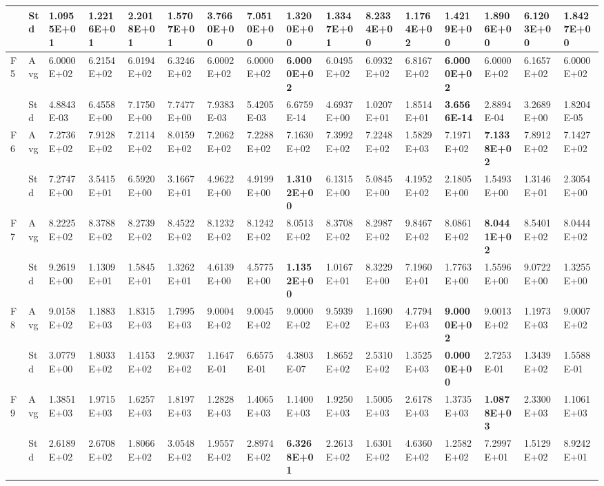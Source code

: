 \documentclass{article} %
\begin{document}
\begin{tabular}{|p{0.3in}|p{0.3in}|p{0.3in}|p{0.3in}|p{0.3in}|p{0.3in}|p{0.3in}|p{0.3in}|p{0.3in}|p{0.3in}|p{0.3in}|p{0.3in}|p{0.3in}|p{0.3in}|p{0.3in}|p{0.5in}|}
 & Std & 1.0955E+01 & 1.2216E+01 & 2.2018E+01 & 1.5707E+01 & 3.7660E+00 & 7.0510E+00 & \textbf{1.3200E+00} & 1.3347E+01 & 8.2334E+00 & 1.1764E+02 & 1.4219E+00 & 1.8906E+00 & 6.1203E+00 & 1.8427E+00 \\ \hline 
F5 & Avg & 6.0000E+02 & 6.2154E+02 & 6.0194E+02 & 6.3246E+02 & 6.0002E+02 & 6.0000E+02 & \textbf{6.0000E+02} & 6.0495E+02 & 6.0932E+02 & 6.8167E+02 & \textbf{6.0000E+02} & 6.0000E+02 & 6.1657E+02 & 6.0000E+02 \\ \hline 
 & Std & 4.8843E-03 & 6.4558E+00 & 7.1750E+00 & 7.7477E+00 & 7.9383E-03 & 5.4205E-03 & 6.6759E-14 & 4.6937E+00 & 1.0207E+01 & 1.8514E+01 & \textbf{3.6566E-14} & 2.8894E-04 & 3.2689E+00 & 1.8204E-05 \\ \hline 
F6 & Avg & 7.2736E+02 & 7.9128E+02 & 7.2114E+02 & 8.0159E+02 & 7.2062E+02 & 7.2288E+02 & 7.1630E+02 & 7.3992E+02 & 7.2248E+02 & 1.5829E+03 & 7.1971E+02 & \textbf{7.1338E+02} & 7.8912E+02 & 7.1427E+02 \\ \hline 
 & Std & 7.2747E+00 & 3.5415E+01 & 6.5920E+00 & 3.1667E+01 & 4.9622E+00 & 4.9199E+00 & \textbf{1.3102E+00} & 6.1315E+00 & 5.0845E+00 & 4.1952E+02 & 2.1805E+00 & 1.5493E+00 & 1.3146E+01 & 2.3054E+00 \\ \hline 
F7 & Avg & 8.2225E+02 & 8.3788E+02 & 8.2739E+02 & 8.4522E+02 & 8.1232E+02 & 8.1242E+02 & 8.0513E+02 & 8.3708E+02 & 8.2987E+02 & 9.8467E+02 & 8.0861E+02 & \textbf{8.0441E+02} & 8.5401E+02 & 8.0444E+02 \\ \hline 
 & Std & 9.2619E+00 & 1.1309E+01 & 1.5845E+01 & 1.3262E+01 & 4.6139E+00 & 4.5775E+00 & \textbf{1.1352E+00} & 1.0167E+01 & 8.3229E+00 & 7.1960E+01 & 1.7763E+00 & 1.5596E+00 & 9.0722E+00 & 1.3255E+00 \\ \hline 
F8 & Avg & 9.0158E+02 & 1.1883E+03 & 1.8315E+03 & 1.7995E+03 & 9.0004E+02 & 9.0045E+02 & 9.0000E+02 & 9.5939E+02 & 1.1690E+03 & 4.7794E+03 & \textbf{9.0000E+02} & 9.0013E+02 & 1.1973E+03 & 9.0007E+02 \\ \hline 
 & Std & 3.0779E+00 & 1.8033E+02 & 1.4153E+02 & 2.9037E+02 & 1.1647E-01 & 6.6575E-01 & 4.3803E-07 & 1.8652E+02 & 2.5310E+02 & 1.3525E+03 & \textbf{0.0000E+00} & 2.7253E-01 & 1.3439E+02 & 1.5588E-01 \\ \hline 
F9 & Avg & 1.3851E+03 & 1.9715E+03 & 1.6257E+03 & 1.8197E+03 & 1.2828E+03 & 1.4065E+03 & 1.1400E+03 & 1.9250E+03 & 1.5005E+03 & 2.6178E+03 & 1.3735E+03 & \textbf{1.0878E+03} & 2.3300E+03 & 1.1061E+03 \\ \hline 
 & Std & 2.6189E+02 & 2.6708E+02 & 1.8066E+02 & 3.0548E+02 & 1.9557E+02 & 2.8974E+02 & \textbf{6.3268E+01} & 2.2613E+02 & 1.6301E+02 & 4.6360E+02 & 1.2582E+02 & 7.2997E+01 & 1.5129E+02 & 8.9242E+01 \\ \hline 

\end{tabular}
\end{document}
